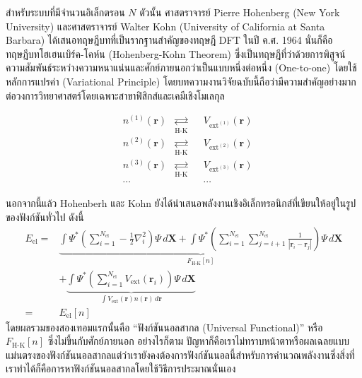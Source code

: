 สำหรับระบบที่มีจำนวนอิเล็กตรอน $N$ ตัวนั้น ศาสตราจารย์ Pierre Hohenberg (New York University) และศาสตราจารย์ Walter Kohn (University of California at Santa Barbara) ได้เสนอทฤษฎีบทที่เป็นรากฐานสำคัญของทฤษฎี DFT ในปี ค.ศ. 1964 นั่นก็คือทฤษฎีบทโฮเฮนเบิร์ค-โคห์น (Hohenberg-Kohn Theorem)\autocite{hohenberg1964} ซึ่งเป็นทฤษฎีที่ว่าด้วยการพิสูจน์ความสัมพันธ์ระหว่างความหนาแน่นและศักย์ภายนอกว่าเป็นแบบหนึ่งต่อหนึ่ง (One-to-one) โดยใช้หลักการแปรค่า (Variational Principle) โดยบทความงานวิจัยฉบับนี้ถือว่ามีความสำคัญอย่างมากต่อวงการวิทยาศาสตร์โดยเฉพาะสาขาฟิสิกส์และเคมีเชิงโมเลกุล

\begin{framed}
    \centering
    \begin{align*}
         & n^{(1)}(\bm{r}) & \underset{\text{H-K}}{\rightleftarrows} &  & V_{\text{ext}^{(1)}}(\bm{r}) \\[0.5ex]
         & n^{(2)}(\bm{r}) & \underset{\text{H-K}}{\rightleftarrows} &  & V_{\text{ext}^{(2)}}(\bm{r}) \\[0.5ex]
         & n^{(3)}(\bm{r}) & \underset{\text{H-K}}{\rightleftarrows} &  & V_{\text{ext}^{(3)}}(\bm{r}) \\[0.5ex]
         & \cdots          &                                         &  & \cdots
    \end{align*}
\end{framed}

นอกจากนี้แล้ว Hohenberh และ Kohn ยังได้นำเสนอพลังงานเชิงอิเล็กทรอนิกส์ที่เขียนให้อยู่ในรูปของฟังก์ชันทั่วไป ดังนี้
%
\begin{align}\label{eq:ener_univer_ext_pot}
    E_{\text{el}} = & \underbrace{\int \Psi^{\ast}
        \left ( \sum^{N_{\text{el}}}_{i=1} -\frac{1}{2} \nabla^{2}_{i} \right )
        \Psi \, d\bm{X}
        + \int \Psi^{\ast}
        \left ( \sum^{N_{\text{el}}}_{i=1} \sum^{N_{\text{el}}}_{j=i+1} \frac{1}{|\bm{r}_{i}-\bm{r}_{j}|} \right )
    \Psi \, d\bm{X}}_{\textstyle F_{\text{H-K}}[n]} \nonumber       \\
                    & + \underbrace{\int \Psi^{\ast}
        \left ( \sum^{N_{\text{el}}}_{i=1} V_{\text{ext}}(\bm{r}_{i}) \right )
        \Psi \, d\bm{X}    }_{\textstyle \int V_{\text{ext}}(\bm{r}) n(\bm{r}) \, d\bm{r}} \\
    =               & E_{\text{el}}[n]
\end{align}
%
\noindent โดยผลรวมของสองเทอมแรกนั้นคือ \enquote{ฟังก์ชันนอลสากล (Universal Functional)} หรือ $F_{\text{H-K}}[n]$ ซึ่งไม่ขึ้นกับศักย์ภายนอก อย่างไรก็ตาม ปัญหาก็คือเราไม่ทราบหน้าตาหรือผลเฉลยแบบแม่นตรงของฟังก์ชันนอลสากลแต่ว่าเรายังคงต้องการฟังก์ชันนอลนี้สำหรับการคำนวณพลังงานซึ่งสิ่งที่เราทำได้ก็คือการหาฟังก์ชันนอลสากลโดยใช้วิธีการประมาณนั่นเอง


